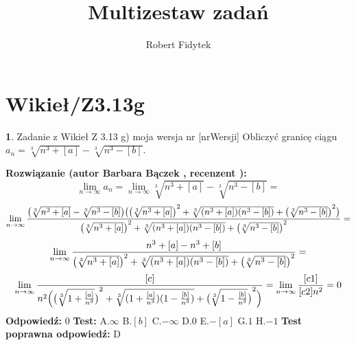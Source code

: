 \documentclass[12pt, a4paper]{article}
\title{Multizestaw zadań}
\author{Robert Fidytek}
\date{}
\theoremstyle{definition} %
\newtheorem{zad}{}
\newcommand{\kategoria}[1]{\section{#1}} %
\newcommand{\zadStart}[1]{\begin{zad}#1\newline} %
\newcommand{\zadStop}{\end{zad}}   %
\newcommand{\rozwStart}[2]{\noindent \textbf{Rozwiązanie (autor #1 , recenzent #2): }\newline} %
\newcommand{\rozwStop}{\newline}                                            %
\newcommand{\odpStart}{\noindent \textbf{Odpowiedź:}\newline}    %
\newcommand{\odpStop}{\newline}                                             %
\newcommand{\testStart}{\noindent \textbf{Test:}\newline} %
\newcommand{\testStop}{\newline} %
\newcommand{\kluczStart}{\noindent \textbf{Test poprawna odpowiedź:}\newline} %
\newcommand{\kluczStop}{\newline} %
\begin{document}
\maketitle


\kategoria{Wikieł/Z3.13g}
\zadStart{Zadanie z Wikieł Z 3.13 g) moja wersja nr [nrWersji]}
Obliczyć granicę ciągu $a_n= \sqrt[3]{n^3+[a]} -\sqrt[3]{n^3-[b]}$.
\zadStop
\rozwStart{Barbara Bączek}{}
$$\lim_{n \rightarrow \infty} a_n= \lim_{n \rightarrow \infty} \sqrt[3]{n^3+[a]} -\sqrt[3]{n^3-[b]}= $$
$$\lim_{n \rightarrow \infty} \frac{\big{(}\sqrt[3]{n^3+[a]} -\sqrt[3]{n^3-[b]}\big{)}\big{(}{\big{(}\sqrt[3]{n^3+[a]}\big{)}}^2 + \sqrt[3]{(n^3+[a])(n^3-[b])}+ {\big{(}\sqrt[3]{n^3-[b]}\big{)}}^2\big{)}}{{\big{(}\sqrt[3]{n^3+[a]}\big{)}}^2 + \sqrt[3]{(n^3+[a])(n^3-[b])}+ {\big{(}\sqrt[3]{n^3-[b]}\big{)}}^2 }=$$
$$\lim_{n \rightarrow \infty} \frac{n^3+[a]-n^3+[b]}{{\big{(}\sqrt[3]{n^3+[a]}\big{)}}^2 + \sqrt[3]{(n^3+[a])(n^3-[b])}+ {\big{(}\sqrt[3]{n^3-[b]}\big{)}}^2}=$$
$$\lim_{n \rightarrow \infty} \frac{[c]}{n^2\Big{(}{\big{(}\sqrt[3]{1+\frac{[a]}{n^3}}\big{)}}^2 + \sqrt[3]{(1+\frac{[a]}{n^3})(1-\frac{[b]}{n^3})}+ {\big{(}\sqrt[3]{1-\frac{[b]}{n^3}}\big{)}}^2\Big{)}}= \lim_{n \rightarrow \infty} \frac{[c1]}{[c2]n^2}= 0$$
\rozwStop
\odpStart
$0$
\odpStop
\testStart
A.$\infty$
B.$[b]$
C.$-\infty$
D.$0$
E.$-[a]$
G.$1$
H.$-1$
\testStop
\kluczStart
D
\kluczStop
\end{document}
